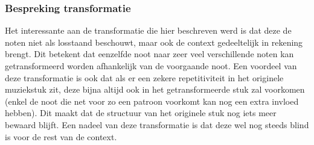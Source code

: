 \subsubsection{Bespreking transformatie}
Het interessante aan de transformatie die hier beschreven werd is dat deze de noten niet als losstaand beschouwt, maar ook de context gedeeltelijk in rekening brengt. Dit betekent dat eenzelfde noot naar zeer veel verschillende noten kan getransformeerd worden afhankelijk van de voorgaande noot. Een voordeel van deze transformatie is ook dat als er een zekere repetitiviteit in het originele muziekstuk zit, deze bijna altijd ook in het getransformeerde stuk zal voorkomen (enkel de noot die net voor zo een patroon voorkomt kan nog een extra invloed hebben). Dit maakt dat de structuur van het originele stuk nog iets meer bewaard blijft. Een nadeel van deze transformatie is dat deze wel nog steeds blind is voor de rest van de context.  


